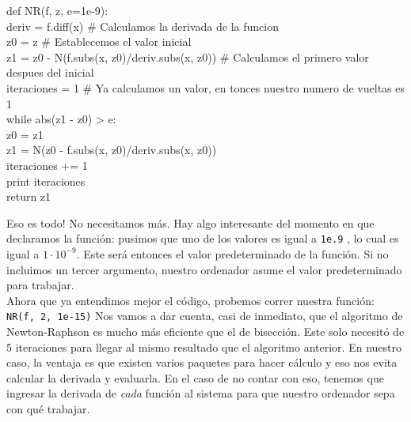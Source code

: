 \documentclass[10pt,letterpaper]{article}
\newcommand{\inlinecode}[1]{
\colorbox{light-gray}{\texttt{#1}}
}
\newenvironment{Code}
{
\begin{lrbox}{\selvestebox}%
\begin{minipage}{\dimexpr\columnwidth-2\fboxsep\relax}
\fontfamily{\ttdefault}\selectfont
}
{\end{minipage}\end{lrbox}%
\begin{center}
\colorbox{light-gray}{\usebox{\selvestebox}}
\end{center}
}
\begin{document}
\begin{footnotesize}
\begin{Code}
def NR(f, z, e=1e-9):\\
\hspace*{5mm} deriv = f.diff(x) \# Calculamos la derivada de la funcion\\
\hspace*{5mm} z0 = z \# Establecemos el valor inicial\\
\hspace*{5mm} z1 = z0 - N(f.subs(x, z0)/deriv.subs(x, z0)) \# Calculamos el primero valor despues del inicial\\
\hspace*{5mm} iteraciones = 1 \# Ya calculamos un valor, en tonces nuestro numero de vueltas es 1\\
\hspace*{5mm} while abs(z1 - z0) > e:\\
\hspace*{11mm} z0 = z1\\
\hspace*{11mm} z1 = N(z0 - f.subs(x, z0)/deriv.subs(x, z0))\\
\hspace*{11mm} iteraciones += 1\\
\hspace*{5mm} print iteraciones\\
\hspace*{5mm} return z1
\end{Code}
\end{footnotesize}

Eso es todo! No necesitamos m\'as. Hay algo interesante del momento en que declaramos la funci\'on: pusimos que uno de los valores es igual a \inlinecode{1e.9}, lo cual es igual a  $1 \cdot 10^{-9}$. Este ser\'a entonces el valor predeterminado de la funci\'on. Si no incluimos un tercer argumento, nuestro ordenador asume el valor predeterminado para trabajar.\\

Ahora que ya entendimos mejor el c\'odigo, probemos correr nuestra funci\'on: \inlinecode{NR(f, 2, 1e-15)} Nos vamos a dar cuenta, casi de inmediato, que el algoritmo de Newton-Raphson es mucho m\'as eficiente que el de bisecci\'on. Este solo necesit\'o de 5 iteraciones para llegar al mismo resultado que el algoritmo anterior. En nuestro caso, la ventaja es que existen varios paquetes para hacer c\'alculo y eso nos evita calcular la derivada y evaluarla. En el caso de no contar con eso, tenemos que ingresar la derivada de \emph{cada} funci\'on al sistema para que nuestro ordenador sepa con qu\'e trabajar.
\end{document}
